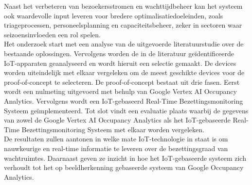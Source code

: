 Naast het verbeteren van bezoekersstromen en wachttijdbeheer kan het systeem ook waardevolle input leveren voor bredere optimalisatiedoeleinden, zoals triageprocessen, personeelsplanning en capaciteitsbeheer, zeker in sectoren waar seizoensinvloeden een rol spelen. \\

Het onderzoek start met een analyse van de uitgevoerde literatuurstudie over de bestaande oplossingen. Vervolgens worden de in de literatuur geïdentificeerde IoT-apparaten geanalyseerd en wordt hieruit een selectie gemaakt. De devices worden uiteindelijk met elkaar vergeleken om de meest geschikte devices voor de proof-of-concept te selecteren. De proof-of-concept bestaat uit drie fasen. Eerst wordt een nulmeting uitgevoerd met behulp van Google Vertex AI Occupancy Analytics. Vervolgens wordt een IoT-gebaseerd Real-Time Bezettingsmonitoring Systeem geïmplementeerd. Tot slot vindt een evaluatie plaats waarbij de gegevens van zowel de Google Vertex AI Occupancy Analytics als het IoT-gebaseerde Real-Time Bezettingsmonitoring Systeem met elkaar worden vergeleken. \\

De resultaten zullen aantonen in welke mate IoT-technologie in staat is om nauwkeurige en real-time informatie te leveren over de bezettingsgraad van wachtruimtes. Daarnaast geven ze inzicht in hoe het IoT-gebaseerde systeem zich verhoudt tot het op beeldherkenning gebaseerde systeem van Google Occupancy Analytics.

